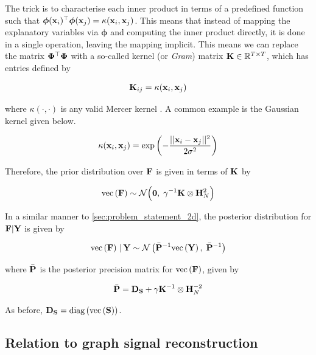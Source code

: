 The trick is to characterise each inner product in terms of a predefined function such that $\boldsymbol{\phi}(\mathbf{x}_i)^\top\boldsymbol{\phi}(\mathbf{x}_j) = \kappa(\mathbf{x}_i, \mathbf{x}_j)$. This means that instead of mapping the explanatory variables via $\boldsymbol{\phi}$ and computing the inner product directly, it is done in a single operation, leaving the mapping implicit. This means we can replace the matrix $\mathbf{\Phi}^\top \mathbf{\Phi}$ with a so-called kernel (or \textit{Gram}) matrix $\mathbf{K} \in \mathbb{R}^{T \times T}$, which has entries defined by 

\begin{equation}
    \mathbf{K}_{ij} =  \kappa(\mathbf{x}_i, \mathbf{x}_j)
\end{equation}

where $\kappa(\cdot, \cdot)$ is any valid Mercer kernel \citep{Rasmussen2005}. A common example is the Gaussian kernel given below. 

\begin{equation}
    \kappa(\mathbf{x}_i, \mathbf{x}_j) = \exp\left(-\frac{|| \mathbf{x}_i - \mathbf{x}_j ||^2}{2 \sigma^2}\right)
\end{equation}

Therefore, the prior distribution over $\mathbf{F}$ is given in terms of $\mathbf{K}$ by 

\begin{equation}
    \label{eq:F_prior3}
    \text{\textup{vec}}\left(\mathbf{F}\right) \sim \mathcal{N}\Big(\mathbf{0}, \; \gamma^{-1} \mathbf{K} \otimes \mathbf{H}_N^{2}\Big)
\end{equation}

In a similar manner to \cref{sec:problem_statement_2d}, the posterior distribution for $\mathbf{F} | \mathbf{Y}$ is given by 

\begin{equation}
    \label{eq:F_post_kgr}
    \text{\textup{vec}}\left(\mathbf{F}\right) \, | \, \mathbf{Y} \sim \mathcal{N}\left(\bar{\mathbf{P}}^{-1}\text{\textup{vec}}\left(\mathbf{Y}\right), \; \bar{\mathbf{P}}^{-1}\right)
\end{equation}

where $\bar{\mathbf{P}}$ is the posterior precision matrix for $\text{\textup{vec}}\left(\mathbf{F}\right)$, given by

\begin{equation}
    \label{eq:P_post_kgr}
    \bar{\mathbf{P}} = \mathbf{D}_{\mathbf{S}} + \gamma \mathbf{K}^{-1} \otimes \mathbf{H}_N^{-2}
\end{equation}

As before, $\mathbf{D}_{\mathbf{S}} = \text{\textup{diag}}\left(\text{\textup{vec}}\left(\mathbf{S}\right)\right)$. 

\subsection{Relation to graph signal reconstruction}

